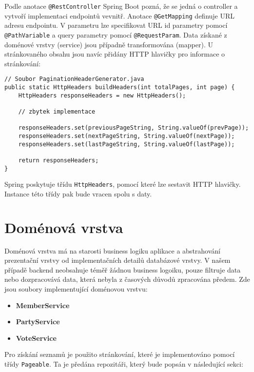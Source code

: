 \noindent Podle anotace \lstinline|@RestController| Spring Boot pozná, že se jedná o controller a vytvoří implementaci endpointů vevnitř. Anotace \lstinline|@GetMapping| definuje URL adresu endpointu. V parametru lze specifikovat URL id parametry pomocí \lstinline{@PathVariable} a query parametry pomocí \lstinline|@RequestParam|. Data získané z doménové vrstvy (service) jsou případně transformována (mapper). U stránkovaného obsahu jsou navíc přidány HTTP hlavičky pro informace o stránkování:

\begin{lstlisting}[caption={Ukázka nastavení hlaviček pro stránkování}, label={lst:headers-paging}, tabsize=2]
// Soubor PaginationHeaderGenerator.java
public static HttpHeaders buildHeaders(int totalPages, int page) {
	HttpHeaders responseHeaders = new HttpHeaders();

	// zbytek implementace
	
	responseHeaders.set(previousPageString, String.valueOf(prevPage));
	responseHeaders.set(nextPageString, String.valueOf(nextPage));
	responseHeaders.set(lastPageString, String.valueOf(lastPage));
	
	return responseHeaders;
}
\end{lstlisting}

\noindent Spring poskytuje třídu \lstinline|HttpHeaders|, pomocí které lze sestavit HTTP hlavičky. Instance této třídy pak bude vracen spolu s daty.

\section {Doménová vrstva}
Doménová vrstva má na starosti business logiku aplikace a abstrahování prezentační vrstvy od implementačních detailů databázové vrstvy. V našem případě backend neobsahuje téměř žádnou business logoiku, pouze filtruje data nebo dozpracovává data, která nebyla z časových důvodů zpracována předem. Zde jsou soubory implementující doménovou vrstvu:

\begin{itemize}
	\item \textbf{MemberService}
	\item \textbf{PartyService}
	\item \textbf{VoteService}
\end{itemize}

\noindent Pro získání seznamů je použito stránkování, které je implementováno pomocí třídy \lstinline|Pageable|. Ta je předána repozitáři, který bude popsán v následující sekci:

